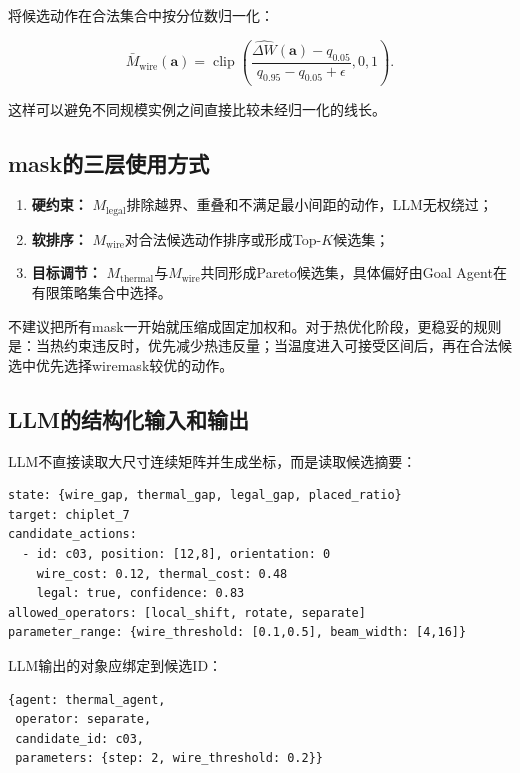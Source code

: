 \documentclass[UTF8,a4paper,12pt]{ctexart}
\newcommand{\action}{\boldsymbol{a}}
\newcommand{\wiremask}{M_{\mathrm{wire}}}
\newcommand{\legalitymask}{M_{\mathrm{legal}}}
\newcommand{\thermalmask}{M_{\mathrm{thermal}}}
\begin{document}
将候选动作在合法集合中按分位数归一化：

\begin{equation}
\bar M_{\mathrm{wire}}(\action)=
\operatorname{clip}\left(
\frac{\widehat{\Delta W}(\action)-q_{0.05}}
{q_{0.95}-q_{0.05}+\epsilon},0,1\right).
\end{equation}

这样可以避免不同规模实例之间直接比较未经归一化的线长。

\subsection{mask的三层使用方式}

\begin{enumerate}[leftmargin=2.5em]
  \item \textbf{硬约束：} $\legalitymask$排除越界、重叠和不满足最小间距的动作，LLM无权绕过；
  \item \textbf{软排序：} $\wiremask$对合法候选动作排序或形成Top-$K$候选集；
  \item \textbf{目标调节：} $\thermalmask$与$\wiremask$共同形成Pareto候选集，具体偏好由Goal Agent在有限策略集合中选择。
\end{enumerate}

不建议把所有mask一开始就压缩成固定加权和。对于热优化阶段，更稳妥的规则是：当热约束违反时，优先减少热违反量；当温度进入可接受区间后，再在合法候选中优先选择wiremask较优的动作。

\subsection{LLM的结构化输入和输出}

LLM不直接读取大尺寸连续矩阵并生成坐标，而是读取候选摘要：

\begin{verbatim}
state: {wire_gap, thermal_gap, legal_gap, placed_ratio}
target: chiplet_7
candidate_actions:
  - id: c03, position: [12,8], orientation: 0
    wire_cost: 0.12, thermal_cost: 0.48
    legal: true, confidence: 0.83
allowed_operators: [local_shift, rotate, separate]
parameter_range: {wire_threshold: [0.1,0.5], beam_width: [4,16]}
\end{verbatim}

LLM输出的对象应绑定到候选ID：

\begin{verbatim}
{agent: thermal_agent,
 operator: separate,
 candidate_id: c03,
 parameters: {step: 2, wire_threshold: 0.2}}
\end{verbatim}
\end{document}
